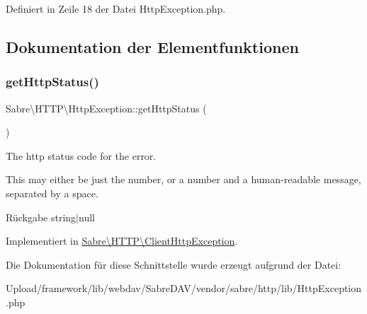 Definiert in Zeile 18 der Datei Http\+Exception.\+php.



\subsection{Dokumentation der Elementfunktionen}
\mbox{\label{interface_sabre_1_1_h_t_t_p_1_1_http_exception_a3f276c42a877c12d0fe55b644e9dad73}} 
\subsubsection{\texorpdfstring{get\+Http\+Status()}{getHttpStatus()}}
{\footnotesize\ttfamily Sabre\textbackslash{}\+H\+T\+T\+P\textbackslash{}\+Http\+Exception\+::get\+Http\+Status (\begin{DoxyParamCaption}{ }\end{DoxyParamCaption})}

The http status code for the error.

This may either be just the number, or a number and a human-\/readable message, separated by a space.

\begin{DoxyReturn}{Rückgabe}
string$\vert$null 
\end{DoxyReturn}


Implementiert in \mbox{\hyperlink{class_sabre_1_1_h_t_t_p_1_1_client_http_exception_a1112cedae2996f53423d24c2f0193a12}{Sabre\textbackslash{}\+H\+T\+T\+P\textbackslash{}\+Client\+Http\+Exception}}.



Die Dokumentation für diese Schnittstelle wurde erzeugt aufgrund der Datei\+:\begin{DoxyCompactItemize}
\item 
Upload/framework/lib/webdav/\+Sabre\+D\+A\+V/vendor/sabre/http/lib/Http\+Exception.\+php\end{DoxyCompactItemize}
